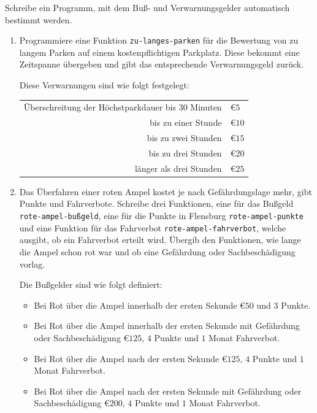 \begin{aufgabe}
  Schreibe ein Programm, mit dem Buß- und Verwarnungsgelder
  automatisch bestimmt werden.
  
  \begin{enumerate}
  \item Programmiere eine Funktion \lstinline{zu-langes-parken}
    für die Bewertung von zu langem Parken auf einem kostenpflichtigen
    Parkplatz. Diese bekommt eine Zeitspanne übergeben und gibt das 
    entsprechende Verwarnungsgeld zurück.
    
    Diese Verwarnungen sind wie folgt festgelegt:
    \begin{flushleft}
      \begin{tabular}{rl}
    Überschreitung der Höchstparkdauer bis 30 Minuten & \euro{$5$}\\
    bis zu einer Stunde & \euro{$10$}\\
    bis zu zwei Stunden & \euro{$15$}\\
    bis zu drei Stunden & \euro{$20$}\\
    länger als drei Stunden &  \euro{$25$}
      \end{tabular}
    \end{flushleft}
    
  \item Das Überfahren einer roten Ampel kostet je nach
    Gefährdungslage mehr, gibt Punkte und Fahrverbote. Schreibe
    drei Funktionen, eine für das Bußgeld \lstinline{rote-ampel-bußgeld}, 
    eine für die Punkte in Flensburg \lstinline{rote-ampel-punkte} 
    und eine Funktion für das Fahrverbot \lstinline{rote-ampel-fahrverbot}, 
    welche ausgibt, ob ein Fahrverbot erteilt wird. Übergib
    den Funktionen, wie lange die Ampel schon rot war und ob eine
    Gefährdung oder Sachbeschädigung vorlag.
    
    Die Bußgelder sind wie folgt definiert:
    \begin{itemize}
    \item Bei Rot über die Ampel innerhalb der ersten Sekunde			
      \euro{$50$} und $3$ Punkte.
    \item Bei Rot über die Ampel innerhalb der ersten Sekunde mit
      Gefährdung oder Sachbeschädigung \euro{$125$}, $4$ 		
      Punkte und $1$ Monat Fahrverbot.
    \item Bei Rot über die Ampel nach der ersten Sekunde \euro{$125$},
      $4$ Punkte und $1$ Monat Fahrverbot.
    \item Bei Rot über die Ampel nach der ersten Sekunde mit
      Gefährdung oder Sachbeschädigung \euro{$200$}, $4$
      Punkte und $1$ Monat Fahrverbot.
    \end{itemize}
    
    
  \end{enumerate}
\end{aufgabe}


